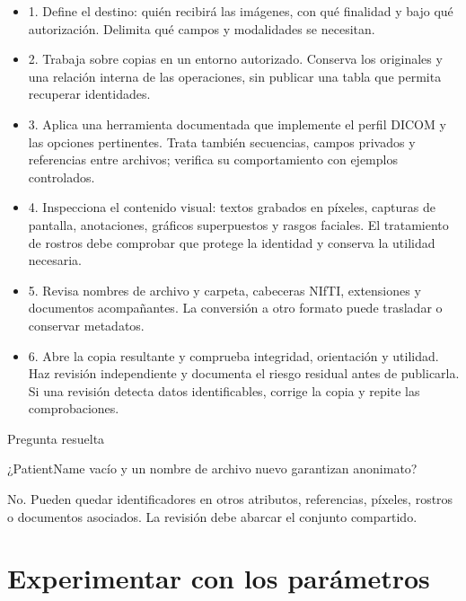 \begin{itemize}

\item 1. Define el destino: quién recibirá las imágenes, con qué finalidad y bajo qué autorización. Delimita qué campos y modalidades se necesitan.

\item 2. Trabaja sobre copias en un entorno autorizado. Conserva los originales y una relación interna de las operaciones, sin publicar una tabla que permita recuperar identidades.

\item 3. Aplica una herramienta documentada que implemente el perfil DICOM y las opciones pertinentes. Trata también secuencias, campos privados y referencias entre archivos; verifica su comportamiento con ejemplos controlados.

\item 4. Inspecciona el contenido visual: textos grabados en píxeles, capturas de pantalla, anotaciones, gráficos superpuestos y rasgos faciales. El tratamiento de rostros debe comprobar que protege la identidad y conserva la utilidad necesaria.

\item 5. Revisa nombres de archivo y carpeta, cabeceras NIfTI, extensiones y documentos acompañantes. La conversión a otro formato puede trasladar o conservar metadatos.

\item 6. Abre la copia resultante y comprueba integridad, orientación y utilidad. Haz revisión independiente y documenta el riesgo residual antes de publicarla. Si una revisión detecta datos identificables, corrige la copia y repite las comprobaciones.

\end{itemize}


\begin{Practica}{Pregunta resuelta}

¿PatientName vacío y un nombre de archivo nuevo garantizan anonimato?


No. Pueden quedar identificadores en otros atributos, referencias, píxeles, rostros o documentos asociados. La revisión debe abarcar el conjunto compartido.


\end{Practica}

\chapter[Experimentar con parámetros]{Experimentar con los parámetros}

